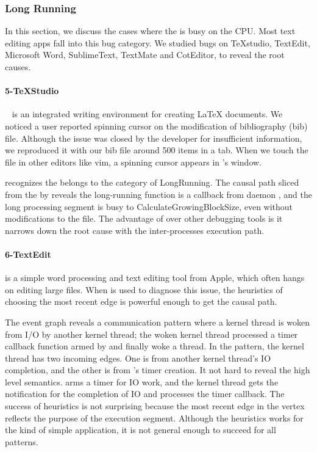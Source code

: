 \subsubsection{Long Running}

In this section, we discuss the cases where the \spinningnode is busy on the
CPU. Most text editing apps fall into this bug category. We studied bugs on
TeXstudio, TextEdit, Microsoft Word, SublimeText, TextMate and CotEditor,
to reveal the root causes.

\paragraph{5-TeXStudio}

~\cite{TeXStudio} is an integrated writing environment for
creating LaTeX documents. We noticed a user reported spinning cursor on the
modification of bibliography (bib) file. Although the issue was closed by the
developer for insufficient information, we reproduced it with our bib file
around 500 items in a  tab. When we touch the file in
other editors like vim, a spinning cursor appears in 's window.

\xxx recognizes the \spinningnode belongs to the category of LongRunning. The
causal path sliced from the \spinningnode by \xxx reveals the long-running
function is a callback from daemon , and the long processing segment
is busy to CalculateGrowingBlockSize, even without modifications to the file.
The advantage of \xxx over other debugging tools is it narrows down the root
cause with the inter-processes execution path.

\paragraph{6-TextEdit}

 is a simple word processing and text editing tool from Apple,
which often hangs on editing large files.  When \xxx is used to diagnose
this issue, the heuristics of choosing the most recent edge is powerful enough 
to get the causal path.

The event graph reveals a communication pattern where a kernel thread is woken
from I/O by another kernel thread; the woken kernel thread processed
a timer callback function armed by  and finally woke a 
thread. In the pattern, the kernel thread has two incoming edges. One is from
another kernel thread's IO completion, and the other is from 's timer
creation. It not hard to reveal the high level semantics.  arms a timer
for IO work, and the kernel thread gets the notification for the completion of IO
and processes the timer callback. The success of heuristics is not surprising
because the most recent edge in the vertex reflects the purpose of the execution
segment. Although the heuristics works for the kind of simple application, it is
not general enough to succeed for all patterns.

